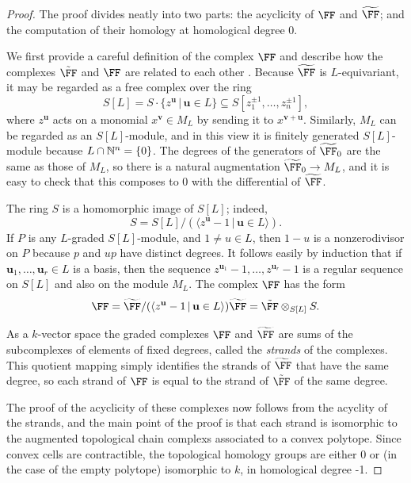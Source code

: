 \documentclass{amsart}
\begin{document}
\begin{proof}
The proof divides neatly into two parts: the acyclicity of $\FF$ and $\tF$; and the computation of their homology at homological degree 0.

We first provide a careful definition of the complex $\FF$ and describe how the complexes $\tilde \FF$ and $\FF$ are related to each other
.
Because $\tF$ is $L$-equivariant, it may be regarded as a free complex over the ring
\[
S[L]=S\cdot \{z^{\mathbf{u}} \,|\, \mathbf{u}\in L\}\subseteq S[z_1^{\pm1},\ldots,z_n^{\pm1}],
\]
where $z^{\mathbf{u}}$ acts on a monomial $x^{\mathbf{v}}\in M_L$ by sending it to $x^{\mathbf{v}+\mathbf{u}}$. Similarly, $M_L$ can be regarded as an $S[L]$-module, and in this view it is finitely generated $S[L]$-module because $L\cap \mathbb N^n=\{0\}$. The degrees of the generators of
$\tF_0$ are the same as those of $M_L$, so there is a natural augmentation $\tF_0\to M_L$, and it is easy to check that this composes to 0 with the differential of $\tF$.

The ring $S$ is a homomorphic image of $S[L]$; indeed,
$$
S = S[L]/(\langle z^{\mathbf{u}}-1 \,|\, \mathbf{u}\in L\rangle).
$$
If $P$ is any $L$-graded $S[L]$-module, and $1 \neq u\in L$, then $1-u$ is a nonzerodivisor on $P$ because $p$ and $up$ have distinct degrees. It follows easily by induction that if $\mathbf{u}_1,\ldots,\mathbf{u}_r\in L$ is a basis, then the sequence $z^{\mathbf{u}_1}-1,\ldots,z^{\mathbf{u}_r}-1$ is a regular sequence on $S[L]$ and also on the module $M_L$. The complex
 $\FF$ has the form
 $$
 \FF = \tF/(\langle z^{\mathbf{u}}-1 \,|\, \mathbf{u}\in L\rangle)\tF =   \tilde \FF \otimes_{S[L]} S.
$$


As a $k$-vector space the graded complexes $\FF$ and $\tF$ are sums of the subcomplexes of elements of fixed degrees, called the \emph{strands} of the complexes.
This quotient mapping simply identifies the strands of $\tF$ that have the same degree, so each strand of
$\FF$ is equal to the strand of $\tilde \FF$ of the same degree.

The proof of the acyclicity of these complexes now follows from the acyclity of the strands, and the main point of the proof is that each strand is isomorphic to the augmented topological chain complexs associated to a convex polytope. Since convex cells are contractible, the topological homology groups are either 0 or (in the case of the empty polytope) isomorphic to $k$, in homological degree -1.


\end{proof}
\end{document}
